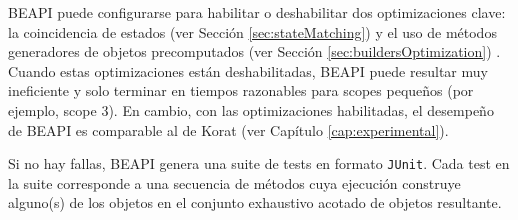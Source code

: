 BEAPI puede configurarse para habilitar o deshabilitar dos optimizaciones clave: 
la coincidencia de estados (ver Sección \ref{sec:stateMatching}) y el uso de métodos generadores de objetos
precomputados (ver Sección \ref{sec:buildersOptimization}) . 
Cuando estas optimizaciones están deshabilitadas, BEAPI puede resultar muy ineficiente 
y solo terminar en tiempos razonables para scopes pequeños (por ejemplo, scope 3). 
En cambio, con las optimizaciones habilitadas, el desempeño de BEAPI es comparable al de Korat (ver Capítulo \ref{cap:experimental}).

Si no hay fallas, BEAPI genera una suite de tests en formato \texttt{JUnit}. 
Cada test en la suite corresponde a una secuencia de métodos cuya ejecución
construye alguno(s) de los objetos en el conjunto exhaustivo acotado de objetos resultante.





